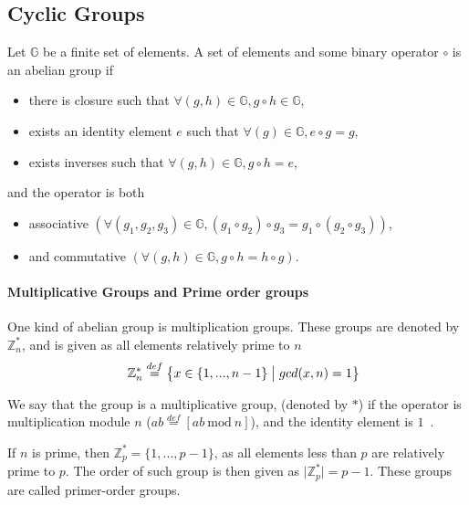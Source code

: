 \subsection{Cyclic Groups}
Let $\mathbb{G}$ be a finite set of elements.
A set of elements and some binary operator $\circ$ is an abelian group if~\cite[page 291]{katz2014introduction}
\begin{itemize}

    \item there is closure such that $\forall(g,h) \in \mathbb{G}, g \circ h \in \mathbb{G}$,
    
    \item exists an identity element $e$ such that $\forall (g) \in \mathbb{G}, e \circ g = g$,
    
    \item exists inverses such that $\forall (g,h) \in \mathbb{G}, g \circ h = e$,
\end{itemize} 
and the operator is both
\begin{itemize}

    \item associative $\left(\forall (g_1, g_2, g_3) \in \mathbb{G}, (g_1 \circ g_2) \circ g_3 = g_1 \circ (g_2 \circ g_3) \right)$,
    
    \item and commutative $\left(\forall (g,h) \in \mathbb{G}, g \circ h = h \circ g\right)$.
    
\end{itemize}

\paragraph{Multiplicative Groups and Prime order groups}
One kind of abelian group is multiplication groups.
These groups are denoted by $\mathbb{Z}^*_n$, and is given as all elements relatively prime to $n$
{\setlength{\mathindent}{0cm}
\begin{align*}
&&    \mathbb{Z}^*_n \stackrel{def}{=} \left\{ x \in \left\{1,..., n-1\right\} \bigm\vert gcd(x,n) = 1 \right\}
\end{align*}}

We say that the group is a multiplicative group, (denoted by $*$) if the operator is multiplication module $n$ ($ab \stackrel{def}{=} \left[ ab~\mathrm{mod}~n \right]$), and the identity element is $1$~\cite[page 295]{katz2014introduction}.

If $n$ is prime, then $\mathbb{Z}^*_p = \big\{ 1, ..., p-1 \big\}$, as all elements less than $p$ are relatively prime to $p$. The order of such group is then given as $\lvert \mathbb{Z}^*_p \rvert = p-1$. These groups are called primer-order groups.

